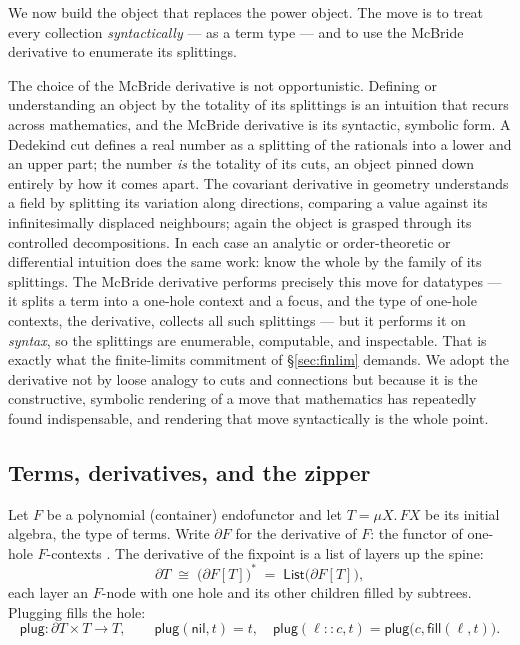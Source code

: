 \documentclass[11pt]{article}
\theoremstyle{definition}
\theoremstyle{plain}
\newcommand{\p}{\partial}
\newcommand{\T}{T}
\newcommand{\List}{\mathsf{List}}
\newcommand{\plug}{\mathsf{plug}}
\begin{document}
We now build the object that replaces the power object. The move is to treat
every collection \emph{syntactically} --- as a term type --- and to use the
McBride derivative to enumerate its splittings.

The choice of the McBride derivative is not opportunistic. Defining or
understanding an object by the totality of its splittings is an intuition that
recurs across mathematics, and the McBride derivative is its syntactic,
symbolic form. A Dedekind cut defines a real number as a splitting of the
rationals into a lower and an upper part; the number \emph{is} the totality of
its cuts, an object pinned down entirely by how it comes apart. The covariant
derivative in geometry understands a field by splitting its variation along
directions, comparing a value against its infinitesimally displaced neighbours;
again the object is grasped through its controlled decompositions. In each case
an analytic or order-theoretic or differential intuition does the same work:
know the whole by the family of its splittings. The McBride derivative
\cite{McBride01,AAGM05} performs precisely this move for datatypes --- it
splits a term into a one-hole context and a focus, and the type of one-hole
contexts, the derivative, collects all such splittings --- but it performs it
on \emph{syntax}, so the splittings are enumerable, computable, and
inspectable. That is exactly what the finite-limits commitment of
\S\ref{sec:finlim} demands. We adopt the derivative not by loose analogy to
cuts and connections but because it is the constructive, symbolic rendering of
a move that mathematics has repeatedly found indispensable, and rendering that
move syntactically is the whole point.

\subsection{Terms, derivatives, and the zipper}

Let $F$ be a polynomial (container) endofunctor and let $\T = \mu X.\,F X$ be
its initial algebra, the type of terms. Write $\p F$ for the derivative of
$F$: the functor of one-hole $F$-contexts \cite{McBride01,AAGM05,Huet97}. The
derivative of the fixpoint is a list of layers up the spine:
\[
  \p\T \;\cong\; \bigl(\p F[\T]\bigr)^{\!\ast}
       \;=\; \List\!\bigl(\p F[\T]\bigr),
\]
each layer an $F$-node with one hole and its other children filled by
subtrees. Plugging fills the hole:
\[
  \plug : \p\T \times \T \longrightarrow \T,
  \qquad
  \plug(\mathsf{nil}, t) = t, \quad
  \plug(\ell :: c, t) = \plug\bigl(c, \mathsf{fill}(\ell, t)\bigr).
\]
\end{document}
